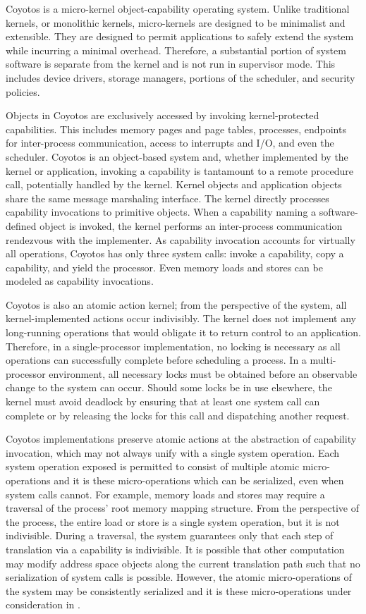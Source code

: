Coyotos is a micro-kernel object-capability operating system.
Unlike traditional kernels, or monolithic kernels, micro-kernels are designed to be minimalist and extensible.
They are designed to permit applications to safely extend the system while incurring a minimal overhead.
Therefore, a substantial portion of system software is separate from the kernel and is not run in supervisor mode.
This includes device drivers, storage managers, portions of the scheduler, and security policies.

Objects in Coyotos are exclusively accessed by invoking kernel-protected capabilities.
This includes memory pages and page tables, processes, endpoints for inter-process communication, access to interrupts and I/O, and even the scheduler.
Coyotos is an object-based system and, whether implemented by the kernel or application, invoking a capability is tantamount to a remote procedure call, potentially handled by the kernel.
Kernel objects and application objects share the same message marshaling interface.
The kernel directly processes capability invocations to primitive objects.
When a capability naming a software-defined object is invoked, the kernel performs an inter-process communication rendezvous with the implementer.
As capability invocation accounts for virtually all operations, Coyotos has only three system calls: invoke a capability, copy a capability, and yield the processor.
Even memory loads and stores can be modeled as capability invocations.

Coyotos is also an atomic action kernel; from the perspective of the system, all kernel-implemented actions occur indivisibly.
The kernel does not implement any long-running operations that would obligate it to return control to an application.
Therefore, in a single-processor implementation, no locking is necessary as all operations can successfully complete before scheduling a process.
In a multi-processor environment, all necessary locks must be obtained before an observable change to the system can occur.
Should some locks be in use elsewhere, the kernel must avoid deadlock by ensuring that at least one system call can complete or by releasing the locks for this call and dispatching another request.

Coyotos implementations preserve atomic actions at the abstraction of capability invocation, which may not always unify with a single system operation.
Each system operation exposed is permitted to consist of multiple atomic micro-operations and it is these micro-operations which can be serialized, even when system calls cannot.
For example, memory loads and stores may require a traversal of the process' root memory mapping structure.
From the perspective of the process, the entire load or store is a single system operation, but it is not indivisible.
During a traversal, the system guarantees only that each step of translation via a capability is indivisible.
It is possible that other computation may modify address space objects along the current translation path such that no serialization of system calls is possible.
However, the atomic micro-operations of the system may be consistently serialized and it is these micro-operations under consideration in \TMmodelName{}.

